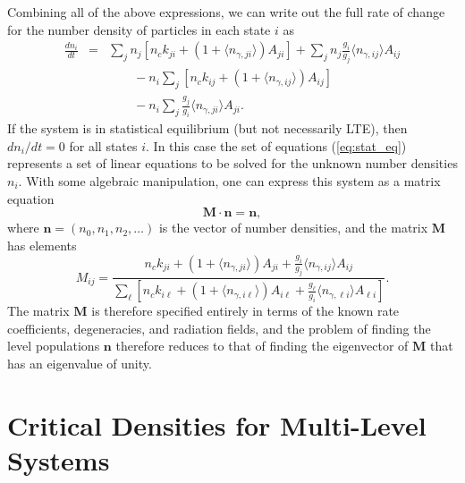 Combining all of the above expressions, we can write out the full rate of change for the number density of particles in each state $i$ as
\begin{eqnarray}
\frac{dn_i}{dt} & = & \sum_j n_j\left[n_c k_{ji} + \left(1+\langle n_{\gamma,ji}\rangle\right) A_{ji}\right] +
 \sum_j n_j \frac{g_i}{g_j} \langle n_{\gamma,ij}\rangle A_{ij}
\nonumber \\
& & \qquad {} - n_i \sum_j \left[n_c k_{ij} + \left(1+\langle n_{\gamma,ij}\rangle\right) A_{ij}\right] 
\nonumber \\
& & \qquad {} -
 n_i \sum_j \frac{g_j}{g_i} \langle n_{\gamma,ji}\rangle A_{ji}.
\label{eq:stat_eq}
\end{eqnarray}
If the system is in statistical equilibrium (but not necessarily LTE), then $dn_i/dt = 0$ for all states $i$. In this case the set of equations (\ref{eq:stat_eq}) represents a set of linear equations to be solved for the unknown number densities $n_i$. With some algebraic manipulation, one can express this system as a matrix equation
\begin{equation}
\mathbf{M} \cdot \mathbf{n} = \mathbf{n},
\end{equation}
where $\mathbf{n} = (n_0, n_1, n_2, \ldots)$ is the vector of number densities, and the matrix $\mathbf{M}$ has elements
\begin{equation}
M_{ij} = \frac{n_c k_{ji} + \left(1 + \langle n_{\gamma,ji}\rangle\right) A_{ji} + \frac{g_i}{g_j} \langle n_{\gamma,ij}\rangle A_{ij}}
{ \sum_\ell \left[n_c k_{i\ell} + \left(1 + \langle n_{\gamma,i\ell}\rangle\right) A_{i\ell} + \frac{g_\ell}{g_i} \langle n_{\gamma,\ell i}\rangle A_{\ell i}\right] }.
\end{equation}
The matrix $\mathbf{M}$ is therefore specified entirely in terms of the known rate coefficients, degeneracies, and radiation fields, and the problem of finding the level populations $\mathbf{n}$ therefore reduces to that of finding the eigenvector of $\mathbf{M}$ that has an eigenvalue of unity.

\section{Critical Densities for Multi-Level Systems}

